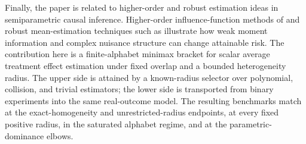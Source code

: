 Finally, the paper is related to higher-order and robust estimation ideas in semiparametric causal inference. Higher-order influence-function methods of \citet{Robins2008,Robins2017} and robust mean-estimation techniques such as \citet{LugosiMendelson2019} illustrate how weak moment information and complex nuisance structure can change attainable risk. The contribution here is a finite-alphabet minimax bracket for scalar average treatment effect estimation under fixed overlap and a bounded heterogeneity radius. The upper side is attained by a known-radius selector over polynomial, collision, and trivial estimators; the lower side is transported from binary experiments into the same real-outcome model. The resulting benchmarks match at the exact-homogeneity and unrestricted-radius endpoints, at every fixed positive radius, in the saturated alphabet regime, and at the parametric-dominance elbows.
